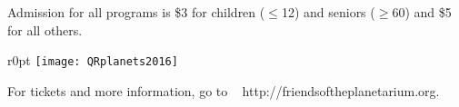 \documentclass{article}
\begin{document}
\medskip

   {\fontsize{16}{18}

Admission for all programs is \$3 for children ($\le$12) and seniors ($\ge$60) and \$5 for all others.

   }



\medskip

   {\fontsize{18}{18}


   \begin{wrapfigure}[2]{r}{0pt}
      \texttt{[image: QRplanets2016]}
   \end{wrapfigure}      
   
\qquad\qquad\qquad\qquad   For tickets and more information, go to \break
  \quad\qquad\qquad\qquad  http://friendsoftheplanetarium.org.


}



\end{document}
